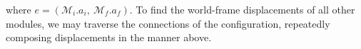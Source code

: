 \documentclass[graybox]{svmult}
\begin{document}
\begin{definition}[Configuration]
where \(e=(\mathcal{M}_i.a_i,~\mathcal{M}_f.a_f)\). To find the world-frame displacements
of all other modules, we may traverse the connections of the configuration,  repeatedly
composing displacements in the manner above. 
\end{definition}

\end{document}
